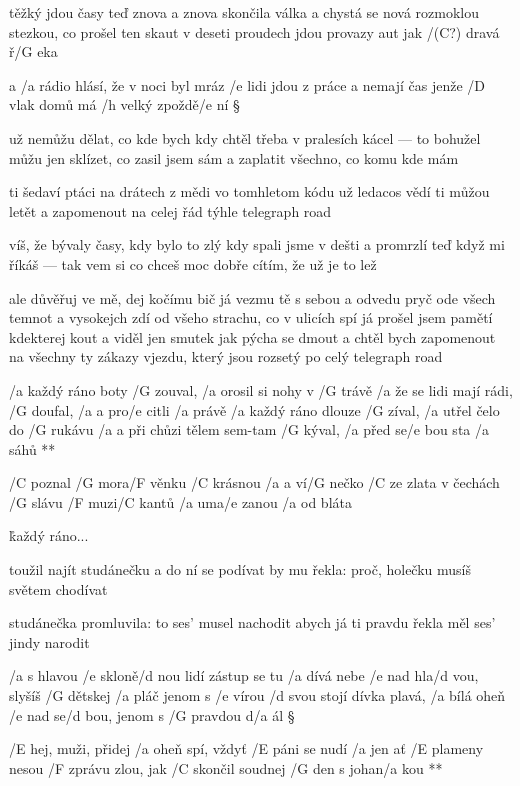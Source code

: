 těžký jdou časy teď znova a znova
skončila válka a chystá se nová
rozmoklou stezkou, co prošel ten skaut
v deseti proudech jdou provazy aut
jak /(C?) dravá ř/G eka \s

a /a rádio hlásí, že v noci byl mráz
/e lidi jdou z práce a nemají čas
jenže /D vlak domů má /h velký zpoždě/e ní \S

už nemůžu dělat, co kde bych kdy chtěl
třeba v pralesích kácel --- to bohužel
můžu jen sklízet, co zasil jsem sám
a zaplatit všechno, co komu kde mám \s

ti šedaví ptáci na drátech z mědi
vo tomhletom kódu už ledacos vědí
ti můžou letět a zapomenout
na celej řád týhle telegraph road \songgg

víš, že bývaly časy, kdy bylo to zlý
kdy spali jsme v dešti a promrzlí
teď když mi říkáš --- tak vem si co chceš
moc dobře cítím, že už je to lež \s

ale důvěřuj ve mě, dej kočímu bič
já vezmu tě s sebou a odvedu pryč
ode všech temnot a vysokejch zdí
od všeho strachu, co v ulicích spí
já prošel jsem pamětí kdekterej kout
a viděl jen smutek jak pýcha se dmout
a chtěl bych zapomenout
na všechny ty zákazy vjezdu, který jsou rozsetý
po celý telegraph road





\R  /a každý ráno boty /G zouval,  /a orosil si nohy v /G trávě
    /a že se lidi mají rádi, /G doufal, /a a pro/e citli /a právě
    /a každý ráno dlouze /G zíval, /a utřel čelo do /G rukávu
    /a a při chůzi tělem sem-tam /G kýval, /a před se/e bou sta /a sáhů **

/C poznal /G mora/F věnku /C krásnou
/a a ví/G nečko /C ze zlata
v čechách /G slávu /F muzi/C kantů
/a uma/e zanou /a od bláta

\r  každý ráno...

toužil najít studánečku
a do ní se podívat
by mu řekla: proč, holečku
musíš světem chodívat \s

studánečka promluvila:
to ses' musel nachodit
abych já ti pravdu řekla
měl ses' jindy narodit

\rr




/a s hlavou /e skloně/d nou lidí zástup se tu /a dívá
nebe /e nad hla/d vou, slyšíš /G dětskej /a pláč
jenom s /e vírou /d svou stojí dívka plavá, /a bílá
oheň /e nad se/d bou, jenom s /G pravdou d/a ál \S

\R /E hej, muži, přidej /a oheň spí, vždyť /E páni se nudí /a jen
   ať /E plameny nesou /F zprávu zlou, jak /C skončil
   soudnej /G den
   s johan/a kou **

